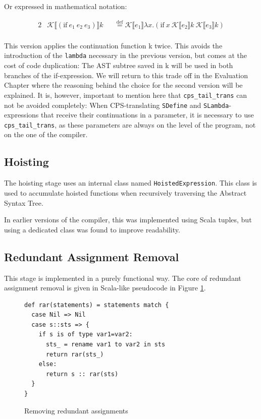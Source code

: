 \documentclass[11pt]{report}
\newcommand{\eqdef}{\stackrel{\text{def}}{=}}%
\newcommand{\cpstrans}[1]{\ensuremath{\mathcal{K}\llbracket #1 \rrbracket}}
\begin{document}
Or expressed in mathematical notation:

\begin{alignat*}{2}
&\cpstrans{(\text{if}\ e_1\ e_2\ e_3)} k &&\eqdef \cpstrans{e_1} \lambda x.(\text{if}\ x\ \cpstrans{e_2}k\ \cpstrans{e_3}k) \\
\end{alignat*}

This version applies the continuation function k twice. This avoids the introduction of the \texttt{lambda} necessary in the previous version, but comes at the cost of code duplication: The AST subtree saved in k will be used in both branches of the if-expression. We will return to this trade off in the Evaluation Chapter where the reasoning behind the choice for the second version will be explained. It is, however, important to mention here that \texttt{cps_tail_trans} can not be avoided completely: When CPS-translating \texttt{SDefine} and \texttt{SLambda}-expressions that receive their continuations in a parameter, it is necessary to use \texttt{cps_tail_trans}, as these parameters are always on the level of the program, not on the one of the compiler.


\subsection{Hoisting}
The hoisting stage uses an inter\-nal class named \texttt{Hoisted\-Expression}. This class is used to accumu\-late hoi\-sted functions when recursively traversing the Abstract Syntax Tree.

In earlier versions of the compiler, this was implemented using Scala tuples, but using a dedicated class was found to improve readability. 


\subsection{Redundant Assignment Removal}
This stage is implemented in a purely functional way. The core of redundant assignment removal is given in Scala-like pseudocode in Figure \ref{remredasign1}.

\begin{figure}[ht]
\begin{lstlisting}
def rar(statements) = statements match {
  case Nil => Nil
  case s::sts => {
    if s is of type var1=var2:
      sts_ = rename var1 to var2 in sts
      return rar(sts_)
    else:
      return s :: rar(sts)
  }
}
\end{lstlisting}
\caption{Removing redundant assignments}
\label{remredasign1}
\end{figure}
\end{document}

